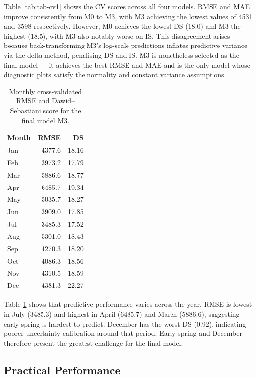 \documentclass[
]{article}
\newcounter{none} %
\begin{document}
Table \ref{tab:tab-cv1} shows the CV scores across all four models. RMSE and MAE improve consistently from M0 to M3, with M3 achieving the lowest values of 4531 and 3598 respectively. However, M0 achieves the lowest DS (18.0) and M3 the highest (18.5), with M3 also notably worse on IS. This disagreement arises because back-transforming M3's log-scale predictions inflates predictive variance via the delta method, penalising DS and IS. M3 is nonetheless selected as the final model --- it achieves the best RMSE and MAE and is the only model whose diagnostic plots satisfy the normality and constant variance assumptions.

\begin{table}[!h]
\centering
\caption{\label{tab:tab-cv2}Monthly cross-validated RMSE and Dawid--Sebastiani score for the final model M3.}
\centering
\begin{tabular}[t]{lrr}
\toprule
Month & RMSE & DS\\
\midrule
Jan & 4377.6 & 18.16\\
Feb & 3973.2 & 17.79\\
Mar & 5886.6 & 18.77\\
Apr & 6485.7 & 19.34\\
May & 5035.7 & 18.27\\
\addlinespace
Jun & 3909.0 & 17.85\\
Jul & 3485.3 & 17.52\\
Aug & 5301.0 & 18.43\\
Sep & 4270.3 & 18.20\\
Oct & 4086.3 & 18.56\\
\addlinespace
Nov & 4310.5 & 18.59\\
Dec & 4381.3 & 22.27\\
\bottomrule
\end{tabular}
\end{table}

Table \ref{tab:tab-cv2} shows that predictive performance varies across the year. RMSE is lowest in July (3485.3) and highest in April (6485.7) and March (5886.6), suggesting early spring is hardest to predict. December has the worst DS (0.92), indicating poorer uncertainty calibration around that period. Early spring and December therefore present the greatest challenge for the final model.

\subsection{Practical Performance}\label{practical-performance}
\end{document}
